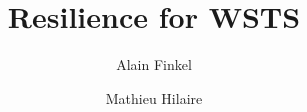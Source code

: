 \documentclass[a4paper,UKenglish,cleveref, autoref, thm-restate]{lipics-v2021}
\title{Resilience for WSTS}
\author{Alain Finkel}
{Université Paris-Saclay\and CNRS\and ENS Paris-Saclay\and Laboratoire Méthodes Formelles (LMF)\and Gif-sur-Yvette, France}
{finkel@lsv.fr}{}{This work was partly done while the author was supported by the Agence Nationale de la Recherche grant no. (numero de la grant BraVASS).}
\author{Mathieu Hilaire}
{Université Paris-Saclay\and CNRS\and ENS Paris-Saclay\and Laboratoire Méthodes Formelles (LMF)\and Gif-sur-Yvette, France}{hilaire@lsv.fr}{}{This work was partly done while the author was supported by the Agence Nationale de la Recherche grant no. (numero de la grant BraVASS).}
\begin{document}
\maketitle


\begin{abstract}
	
\end{abstract}


\newcommand{\LCM}{\mathsf{LCM}}
\newcommand{\LOGSPACE}{\mathsf{LOGSPACE}}
\newcommand{\MSO}{\mathsf{MSO}}
\newcommand{\SO}{\mathsf{SO}}

 \newcommand{\N}{\mathds{N}}



	







% 



 	







\appendix




\end{document}
